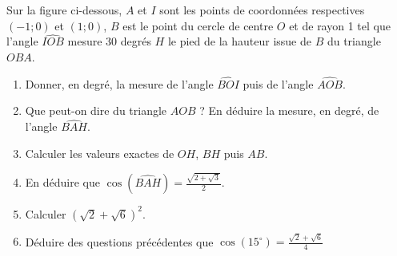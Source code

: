 
%
Sur la figure ci-dessous, $A$ et $I$ sont les points de coordonnées respectives $(-1;0)$ et $(1;0)$, $B$ est le point du cercle de centre $ O $ et de rayon 1 tel que l'angle $  \widehat{ IOB }  $ mesure 30 degrés $H$ le pied de la hauteur issue de $B$ du triangle $OBA$.

\begin{center}
\end{center}
\begin{enumerate}
     \item
     Donner, en degré, la mesure de l'angle $ \widehat{BOI} $ puis de l'angle $\widehat{AOB}$.
     \item
     Que peut-on dire du triangle $AOB$ ? En déduire la mesure, en degré, de l'angle $\widehat{BAH}$.
     \item
     Calculer les valeurs exactes de $OH$, $BH$ puis $AB$.
     \item
     En déduire que $\cos(\widehat{BAH}) = \frac{\sqrt{2+\sqrt{3}}}{2}$.
     \item
     Calculer $( \sqrt{2} +  \sqrt{6})^2  $.
     \item
     Déduire des questions précédentes que $\cos(15^{\circ})=  \frac{ \sqrt{2} +  \sqrt{6}}{4}  $
\end{enumerate}
